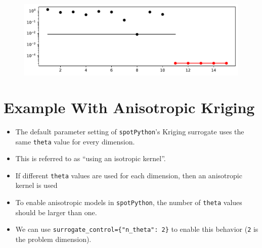 \documentclass[
  letterpaper,
  DIV=11,
  numbers=noendperiod]{scrreprt}
\providecommand{\tightlist}{%
  \setlength{\itemsep}{0pt}\setlength{\parskip}{0pt}}\usepackage{longtable,booktabs,array}
\begin{document}
\begin{figure}[H]

{\centering \includegraphics{03_spot_anisotropic_files/figure-pdf/cell-6-output-1.pdf}

}

\end{figure}

\hypertarget{example-with-anisotropic-kriging}{%
\section{Example With Anisotropic
Kriging}\label{example-with-anisotropic-kriging}}

\begin{itemize}
\tightlist
\item
  The default parameter setting of \texttt{spotPython}'s Kriging
  surrogate uses the same \texttt{theta} value for every dimension.
\item
  This is referred to as ``using an isotropic kernel''.
\item
  If different \texttt{theta} values are used for each dimension, then
  an anisotropic kernel is used
\item
  To enable anisotropic models in \texttt{spotPython}, the number of
  \texttt{theta} values should be larger than one.
\item
  We can use \texttt{surrogate\_control=\{"n\_theta":\ 2\}} to enable
  this behavior (\texttt{2} is the problem dimension).
\end{itemize}
\end{document}
